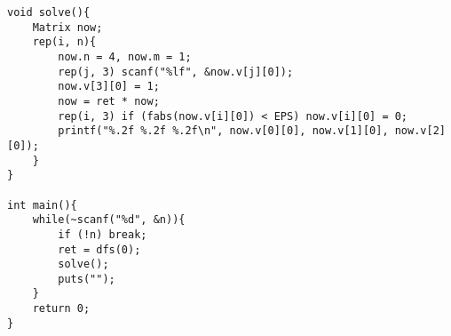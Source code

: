 \begin{verbatim}
void solve(){
    Matrix now;
    rep(i, n){
        now.n = 4, now.m = 1;
        rep(j, 3) scanf("%lf", &now.v[j][0]);
        now.v[3][0] = 1;
        now = ret * now;
        rep(i, 3) if (fabs(now.v[i][0]) < EPS) now.v[i][0] = 0;
        printf("%.2f %.2f %.2f\n", now.v[0][0], now.v[1][0], now.v[2][0]);
    }
}

int main(){
    while(~scanf("%d", &n)){
        if (!n) break;
        ret = dfs(0);
        solve();
        puts("");
    }
    return 0;
}
\end{verbatim}
